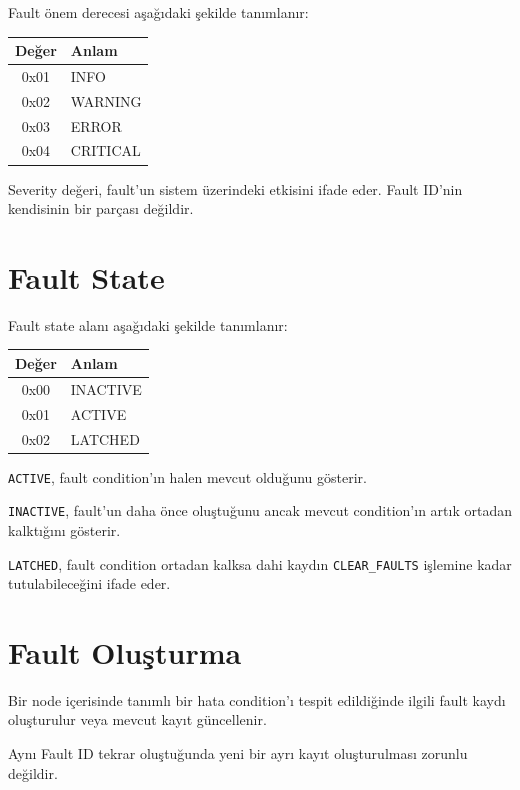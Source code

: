 \documentclass[a4paper,11pt]{article}
\begin{document}
Fault önem derecesi aşağıdaki şekilde tanımlanır:

\begin{center}
\begin{tabular}{c l}
\toprule
\textbf{Değer} & \textbf{Anlam} \\
\midrule
0x01 & INFO \\
0x02 & WARNING \\
0x03 & ERROR \\
0x04 & CRITICAL \\
\bottomrule
\end{tabular}
\end{center}

Severity değeri, fault'un sistem üzerindeki etkisini ifade eder.
Fault ID'nin kendisinin bir parçası değildir.

\section{Fault State}

Fault state alanı aşağıdaki şekilde tanımlanır:

\begin{center}
\begin{tabular}{c l}
\toprule
\textbf{Değer} & \textbf{Anlam} \\
\midrule
0x00 & INACTIVE \\
0x01 & ACTIVE \\
0x02 & LATCHED \\
\bottomrule
\end{tabular}
\end{center}

\texttt{ACTIVE}, fault condition'ın halen mevcut olduğunu gösterir.

\texttt{INACTIVE}, fault'un daha önce oluştuğunu ancak mevcut
condition'ın artık ortadan kalktığını gösterir.

\texttt{LATCHED}, fault condition ortadan kalksa dahi kaydın
\texttt{CLEAR\_FAULTS} işlemine kadar tutulabileceğini ifade eder.

\section{Fault Oluşturma}

Bir node içerisinde tanımlı bir hata condition'ı tespit edildiğinde
ilgili fault kaydı oluşturulur veya mevcut kayıt güncellenir.

Aynı Fault ID tekrar oluştuğunda yeni bir ayrı kayıt oluşturulması
zorunlu değildir.
\end{document}
